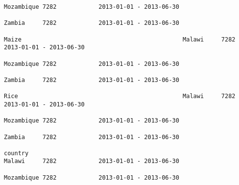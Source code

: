 \documentclass[11pt]{article}
\begin{document}
\begin{Verbatim}[commandchars=\\\{\}]
                                                                                                                                                                                                                 Mozambique 7282            2013-01-01 - 2013-06-30   
                                                                                                                                                                                                                 Zambia     7282            2013-01-01 - 2013-06-30   
                                                                                                                                                              Maize                                              Malawi     7282            2013-01-01 - 2013-06-30   
                                                                                                                                                                                                                 Mozambique 7282            2013-01-01 - 2013-06-30   
                                                                                                                                                                                                                 Zambia     7282            2013-01-01 - 2013-06-30   
                                                                                                                                                              Rice                                               Malawi     7282            2013-01-01 - 2013-06-30   
                                                                                                                                                                                                                 Mozambique 7282            2013-01-01 - 2013-06-30   
                                                                                                                                                                                                                 Zambia     7282            2013-01-01 - 2013-06-30   
                                                                                                                            country                                                                              Malawi     7282            2013-01-01 - 2013-06-30   
                                                                                                                                                                                                                 Mozambique 7282            2013-01-01 - 2013-06-30   

\end{Verbatim}
\end{document}
